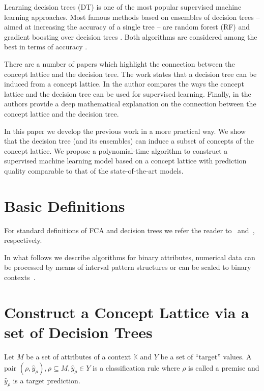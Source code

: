 \documentclass[runningheads]{llncs}
\begin{document}
Learning decision trees (DT) \cite{DT} is one of the most popular supervised machine learning approaches. 
Most famous methods based on ensembles of decision trees -- aimed at increasing the accuracy of a single tree -- are random forest (RF) \cite{RF} and gradient boosting over decision trees \cite{GB}. 
Both algorithms are considered among the best in terms of accuracy \cite{Catboost}.

There are a number of papers which highlight the connection between the concept lattice and the decision tree. The work \cite{InducingDT} states that a decision tree can be induced from a concept lattice. In \cite{KuznetsovDT} the author compares the ways the concept lattice and the decision tree can be used for supervised learning. Finally, in \cite{Krause2020ALB} the authors  provide a  deep mathematical explanation on the connection between the concept lattice and the decision tree.

In this paper we develop the previous work in a more practical way. We show that 
the decision tree (and its ensembles) can %
induce a subset of concepts of the concept lattice. We propose a polynomial-time algorithm to construct a supervised machine learning model based on a concept lattice with prediction 
quality comparable to that of the state-of-the-art models.

\section{Basic Definitions}%

For standard definitions of FCA and decision trees we refer the reader to~\cite{gw99} and~\cite{DT}, respectively.

In what follows we describe algorithms for binary attributes, numerical data can be processed by means of interval pattern structures or can be scaled to binary contexts~\cite{PS_for_complex}.

\section{Construct a Concept Lattice via a set of Decision Trees}

\begin{definition}
Let $M$ be a set of attributes of a context $\mathbb{K}$ and $Y$ be a set of ``target'' values. A pair $(\rho, \hat{y}_\rho), \rho \subseteq M, \hat{y}_\rho \in Y$ is a classification rule where $\rho$ is called a premise and $\hat{y}_\rho$ is a target prediction.
\end{definition}
\end{document}
